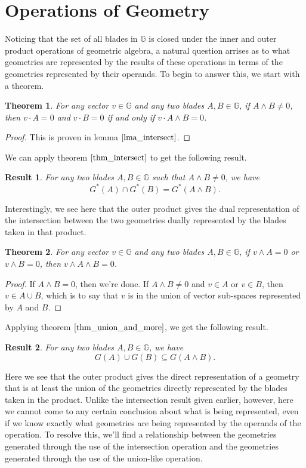 \documentclass[12pt]{article}
\newcommand{\G}{\mathbb{G}}
\newtheorem{theorem}{Theorem}[section]
\newtheorem{result}{Result}[section]
\begin{document}
\section{Operations of Geometry}

Noticing that the set of all blades in $\G$ is closed under the
inner and outer product operations of geometric algebra,
a natural question arrises as to what geometries are represented
by the results of these operations in terms of
the geometries represented by their operands.  To begin to answer this,
we start with a theorem.
\begin{theorem}\label{thm_intersect}
For any vector $v\in\G$ and any two blades $A,B\in\G$,
if $A\wedge B\neq 0$, then $v\cdot A=0$ and $v\cdot B=0$ if and only if $v\cdot A\wedge B=0$.
\end{theorem}
\begin{proof}
This is proven in lemma $\eqref{lma_intersect}$.
\end{proof}
We can apply theorem $\eqref{thm_intersect}$ to get the following result.
\begin{result}
For any two blades $A,B\in\G$ such that $A\wedge B\neq 0$, we have
\begin{equation*}
G^*(A)\cap G^*(B) = G^*(A\wedge B).
\end{equation*}
\end{result}
Interestingly, we see here that the outer product gives the
dual representation of the intersection between the two geometries
dually represented by the blades taken in that product.
\begin{theorem}\label{thm_union_and_more}
For any vector $v\in\G$ and any two blades $A,B\in\G$,
if $v\wedge A=0$ or $v\wedge B=0$, then $v\wedge A\wedge B=0$.
\end{theorem}
\begin{proof}
If $A\wedge B=0$, then we're done.  If $A\wedge B\neq 0$ and $v\in A$ or $v\in B$,
then $v\in A\cup B$, which is to say that $v$ is in the union of vector sub-spaces
represented by $A$ and $B$.
\end{proof}
Applying theorem $\eqref{thm_union_and_more}$, we get the following result.
\begin{result}
For any two blades $A,B\in\G$, we have
\begin{equation*}
G(A)\cup G(B)\subseteq G(A\wedge B).
\end{equation*}
\end{result}
Here we see that the outer product gives the direct representation
of a geometry that is at least the union of the geometries directly
represented by the blades taken in the product.  Unlike the intersection
result given earlier, however, here we cannot come to any certain conclusion
about what is being represented, even if we know exactly what
geometries are being represented by the operands of the operation.
To resolve this, we'll find a relationship between the geometries
generated through the use of the intersection operation and the geometries
generated through the use of the union-like operation.
\end{document}

